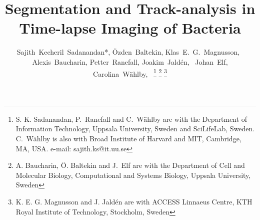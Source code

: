 \documentclass[journal]{IEEEtran}
\begin{document}
%
\title{Segmentation and Track-analysis in Time-lapse Imaging of Bacteria}
%
%
%

\author{Sajith~Kecheril~Sadanandan*,
		\"Ozden~Baltekin,        
        Klas~E.~G.~Magnusson,~%
		Alexis~Baucharin,
		Petter~Ranefall,
		Joakim~Jald\'en,~
		Johan~Elf,
		Carolina~W\"ahlby,~
\thanks{S. K. Sadanandan, P.~Ranefall and C.~W\"ahlby  are with the Department
of Information Technology, Uppsala University, Sweden and SciLifeLab, Sweden. C.~W\"ahlby is also with Broad Institute of Harvard and MIT, Cambridge, MA, USA.
e-mail: sajith.ks@it.uu.se}%
\thanks{A. Baucharin, \"O. Baltekin and J.~Elf are with the Department of Cell and Molecular Biology, Computational and Systems Biology, Uppsala University, Sweden }
\thanks{K. E. G. Magnusson and J. Jald\'en are with ACCESS Linnaeus Centre, KTH Royal Institute of Technology, Stockholm, Sweden }}%


% 
%
\end{document}
